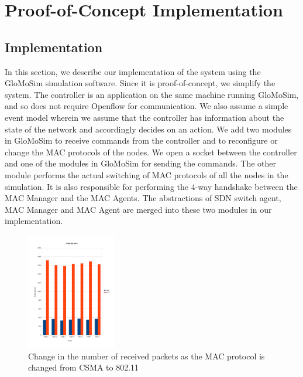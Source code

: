 \section{Proof-of-Concept Implementation}
\label{sec:evaluation}

\subsection{Implementation}

In this section, we describe our implementation of the system using the GloMoSim simulation software. Since it is proof-of-concept, we simplify the system. The controller is an application on the same machine running GloMoSim, and so does not require Openflow for communication. We also assume a simple event model wherein we assume that the controller has information about the state of the network and accordingly decides on an action. We add two modules in GloMoSim to receive commands from the controller and to reconfigure or change the MAC protocols of the nodes. We open a socket between the controller and one of the modules in GloMoSim for sending the commands. The other module performs the actual switching of MAC protocols of all the nodes in the simulation. It is also responsible for performing the 4-way handshake between the MAC Manager and the MAC Agents. The abstractions of SDN switch agent, MAC Manager and MAC Agent are merged into these two modules in our implementation. 

\begin{figure}[t]
  \centering
  \includegraphics[width=0.35\textwidth, scale=0.35]{figures/hidden_recvPkts.pdf}
  \caption{Change in the number of received packets as the MAC protocol is changed from CSMA to 802.11}
  \label{fig:setup}
\end{figure}

